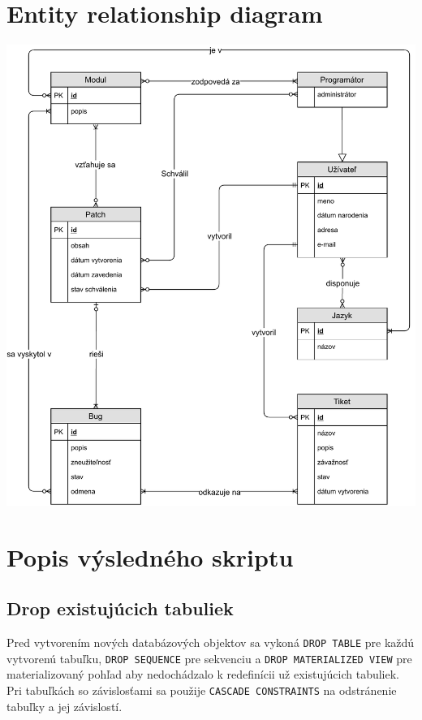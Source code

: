 \documentclass[11pt, a4paper]{article}
\begin{document}
    \section{Entity relationship diagram}
    \label{sec:entity-relationship-diagram}
    \begin{center}
        \vspace*{\fill}
        \includegraphics[width=0.95\linewidth]{ER_diagram.pdf}
        \vspace*{\fill}
    \end{center}

    \newpage


    \section{Popis výsledného skriptu}
    \label{sec:popis-výsledného-skriptu}

    \subsection{Drop existujúcich tabuliek}\label{subsec:drop-existujúcich-tabuliek}

    Pred vytvorením nových databázových objektov sa vykoná \texttt{DROP TABLE} pre každú vytvorenú tabuľku, \texttt{DROP SEQUENCE} pre sekvenciu a \texttt{DROP MATERIALIZED VIEW} pre materializovaný pohľad aby nedochádzalo k redefinícii už existujúcich tabuliek.
    Pri tabuľkách so závislosťami sa použije \texttt{CASCADE CONSTRAINTS} na odstránenie tabuľky a jej závislostí.
\end{document}
